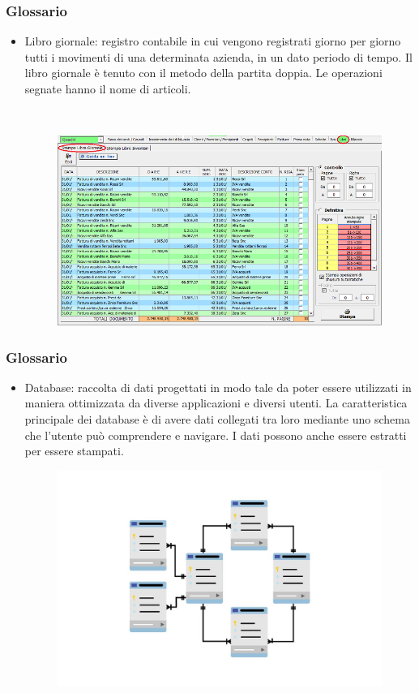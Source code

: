 \documentclass[]{beamer}
\begin{document}
\begin{frame}
\frametitle{Glossario}
\begin{itemize}
  \item \alert{Libro giornale:} registro contabile in cui vengono registrati giorno per giorno tutti i movimenti di una determinata azienda, in un dato periodo di tempo. Il libro giornale è tenuto con il metodo della partita doppia. Le operazioni segnate hanno il nome di articoli.
  
  ~

  \begin{figure}
    \includegraphics[width=.7\columnwidth]{img/librogiornale.png}
  \end{figure}
\end{itemize}
\end{frame}



\begin{frame}
\frametitle{Glossario}
\begin{itemize}
  \item \alert{Database:} raccolta di dati progettati in modo tale da poter essere utilizzati in maniera ottimizzata da diverse applicazioni e diversi utenti. La caratteristica principale dei database è di avere dati collegati tra loro mediante uno schema che l'utente può comprendere e navigare. I dati possono anche essere estratti per essere stampati.  
  \begin{figure}
    \includegraphics[width=.7\columnwidth]{img/database.jpg}
  \end{figure}
\end{itemize}
\end{frame}
\end{document}
